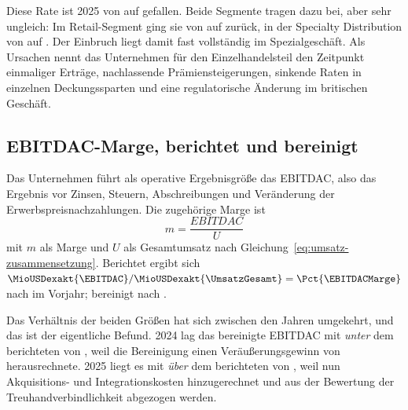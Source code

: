 Diese Rate ist 2025 von \Pct{\OrganischWachstumVJ} auf
\Pct{\OrganischWachstum} gefallen. Beide Segmente tragen
dazu bei, aber sehr ungleich: Im Retail-Segment ging sie von
\Pct{\RetailOrganischVJ} auf \Pct{\RetailOrganisch}
zur\"uck, in der Specialty Distribution von
\Pct{\SpezOrganischVJ} auf \Pct{\SpezOrganisch}.
Der Einbruch liegt damit fast vollst\"andig im Spezialgesch\"aft. Als
Ursachen nennt das Unternehmen f\"ur den Einzelhandelsteil den Zeitpunkt
einmaliger Ertr\"age, nachlassende Pr\"amiensteigerungen, sinkende
Raten in einzelnen Deckungssparten und eine regulatorische \"Anderung im
britischen Gesch\"aft.

\subsection{EBITDAC-Marge, berichtet und bereinigt}

Das Unternehmen f\"uhrt als operative Ergebnisgr\"o{\ss}e das EBITDAC, also
das Ergebnis vor Zinsen, Steuern, Abschreibungen und Ver\"anderung der
Erwerbspreisnachzahlungen. Die zugeh\"orige Marge ist
\begin{equation}
\label{eq:ebitdac-marge}
m = \frac{\mathit{EBITDAC}}{U}
\end{equation}
mit $m$ als Marge und $U$ als Gesamtumsatz nach
Gleichung~\eqref{eq:umsatz-zusammensetzung}. Berichtet ergibt sich
$\MioUSDexakt{\EBITDAC} / \MioUSDexakt{\UmsatzGesamt} =
\Pct{\EBITDACMarge}$ nach \Pct{\EBITDACMargeVJ} im
Vorjahr; bereinigt
\Pct{\EBITDACberMarge} nach \Pct{\EBITDACberMargeVJ}.

Das Verh\"altnis der beiden Gr\"o{\ss}en hat sich zwischen den Jahren
umgekehrt, und das ist der eigentliche Befund. 2024 lag das bereinigte
EBITDAC mit \MioUSDexakt{\EBITDACberVJ} \emph{unter} dem berichteten von
\MioUSDexakt{\EBITDACVJ}, weil die Bereinigung einen
Ver\"au{\ss}erungsgewinn von \MioUSDexakt{\VeraeusserungsergebnisVJ}
herausrechnete. 2025 liegt
es mit \MioUSDexakt{\EBITDACber} \emph{\"uber} dem berichteten von
\MioUSDexakt{\EBITDAC}, weil nun \MioUSDexakt{\AkqIntegrationskosten}
Akquisitions- und Integrationskosten hinzugerechnet und
\MioUSDexakt{\EscrowBewertung} aus der Bewertung der Treuhandverbindlichkeit
abgezogen werden.

